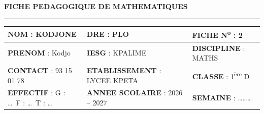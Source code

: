 \documentclass[10pt,a4paper]{article}
\providecommand{\iere}{\textsuperscript{ère}}
\begin{document}
\begin{center}
  {\LARGE\bfseries\color{cTitre}FICHE PEDAGOGIQUE DE MATHEMATIQUES}\\[2pt]
  {\color{cProp}\rule{0.62\linewidth}{1.1pt}}
\end{center}

\vspace{-2pt}
{\setlength{\arrayrulewidth}{0.7pt}
\noindent\begin{tabular}{|L{5.5cm}|L{5.5cm}|L{5.5cm}|}
\hline
{}\textbf{NOM} : KODJONE          & \textbf{DRE} : PLO                & \textbf{FICHE N\textsuperscript{o}} : \textbf{2}\\
\hline
\textbf{PRENOM} : Kodjo                           & \textbf{IESG} : KPALIME           & \textbf{DISCIPLINE} : MATHS\\
\hline
\textbf{CONTACT} : 93 15 01 78                    & \textbf{ETABLISSEMENT} : LYCEE KPETA & \textbf{CLASSE} : 1\iere{} D\\
\hline
\textbf{EFFECTIF} : G : \dots\ F : \dots\ T : \dots & \textbf{ANNEE SCOLAIRE} : 2026 -- 2027 & \textbf{SEMAINE} : \dots\dots\dots\\
\hline
\end{tabular}}
\end{document}
